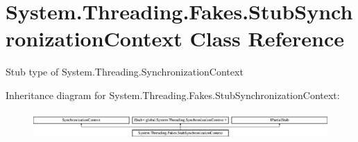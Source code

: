 \hypertarget{class_system_1_1_threading_1_1_fakes_1_1_stub_synchronization_context}{\section{System.\-Threading.\-Fakes.\-Stub\-Synchronization\-Context Class Reference}
\label{class_system_1_1_threading_1_1_fakes_1_1_stub_synchronization_context}
}


Stub type of System.\-Threading.\-Synchronization\-Context 


Inheritance diagram for System.\-Threading.\-Fakes.\-Stub\-Synchronization\-Context\-:\begin{figure}[H]
\begin{center}
\leavevmode
\includegraphics[height=1.072797cm]{class_system_1_1_threading_1_1_fakes_1_1_stub_synchronization_context}
\end{center}
\end{figure}
